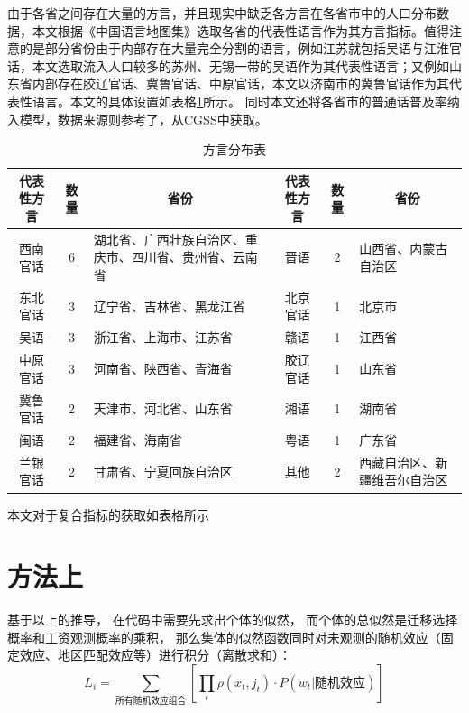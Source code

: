 \documentclass[a4paper, zihao=-4, fontset = mac, oneside]{ctexbook} %
\begin{document}
由于各省之间存在大量的方言，并且现实中缺乏各方言在各省市中的人口分布数据，本文根据《中国语言地图集》选取各省的代表性语言作为其方言指标。值得注意的是部分省份由于内部存在大量完全分割的语言，例如江苏就包括吴语与江淮官话，本文选取流入人口较多的苏州、无锡一带的吴语作为其代表性语言；又例如山东省内部存在胶辽官话、冀鲁官话、中原官话，本文以济南市的冀鲁官话作为其代表性语言。本文的具体设置如表格\ref{tab:方言分布表}所示。
同时本文还将各省市的普通话普及率纳入模型，数据来源则参考了\textcite{YuWeiQiGuoMinPuTongHuaNengLiDeJiBenZhuangKuangYuFaZhanTaiShi2018}，从CGSS中获取。




\begin{table}[!ht]
\centering
\caption{方言分布表}
\begin{tabularx}{\textwidth}{@{}ccXccX@{}}
\toprule
\textbf{代表性方言} & \textbf{数量} & \multicolumn{1}{c}{\textbf{省份}} & \textbf{代表性方言} &\textbf{数量}  & \multicolumn{1}{c}{\textbf{省份}}\\
\midrule
西南官话 & 6 & 湖北省、广西壮族自治区、重庆市、四川省、贵州省、云南省 &晋语 & 2 &山西省、内蒙古自治区\\
东北官话 & 3 &辽宁省、吉林省、黑龙江省 & 北京官话  &1 &北京市\\
吴语 & 3 &浙江省、上海市、江苏省& 赣语  &1 &江西省\\
中原官话 & 3 &河南省、陕西省、青海省 &胶辽官话  &1& 山东省\\
冀鲁官话 & 2 &天津市、河北省、山东省 &湘语  &1 &湖南省\\
闽语 & 2 &福建省、海南省 &粤语  &1& 广东省\\
兰银官话 & 2 &甘肃省、宁夏回族自治区 &其他  &2& 西藏自治区、新疆维吾尔自治区\\
\bottomrule
\end{tabularx}
\label{tab:方言分布表}
\end{table}


本文对于复合指标的获取如表格所示

\section{方法上} %
\label{sub:方法上}

基于以上的推导，
在代码中需要先求出个体的似然，
而个体的总似然是迁移选择概率和工资观测概率的乘积，
那么集体的似然函数同时对未观测的随机效应（固定效应、地区匹配效应等）进行积分（离散求和）：
\begin{equation}
  L_{i}=\sum\limits_{\text{所有随机效应组合}}[\prod_{t}\rho(x_{t},j_{t})\cdot P(w_{t}|\text{随机效应}) ]
\end{equation}
\end{document}
